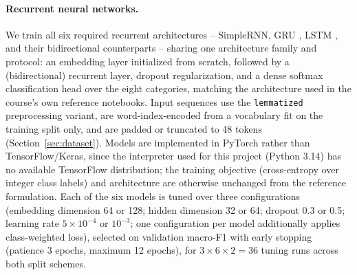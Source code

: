 \documentclass[11pt]{acl}
\begin{document}
\paragraph{Recurrent neural networks.} We train all six required recurrent
architectures -- SimpleRNN, GRU \cite{cho-etal-2014-learning}, LSTM
\cite{hochreiter-schmidhuber-1997-lstm}, and their bidirectional counterparts
\cite{schuster-paliwal-1997-bidirectional} -- sharing one architecture family and
protocol: an embedding layer initialized from scratch, followed by a
(bidirectional) recurrent layer, dropout regularization, and a dense softmax
classification head over the eight categories, matching the architecture used in the
course's own reference notebooks. Input sequences use the \texttt{lemmatized}
preprocessing variant, are word-index-encoded from a vocabulary fit on the training
split only, and are padded or truncated to 48 tokens (Section~\ref{sec:dataset}).
Models are implemented in PyTorch \cite{paszke-etal-2019-pytorch} rather than
TensorFlow/Keras, since the interpreter used for this project (Python 3.14) has no
available TensorFlow distribution; the training objective (cross-entropy over integer
class labels) and architecture are otherwise unchanged from the reference formulation.
Each of the six models is tuned over three configurations (embedding dimension 64 or
128; hidden dimension 32 or 64; dropout 0.3 or 0.5; learning rate $5{\times}10^{-4}$ or
$10^{-3}$; one configuration per model additionally applies class-weighted loss),
selected on validation macro-F1 with early stopping (patience 3 epochs, maximum 12
epochs), for $3 \times 6 \times 2 = 36$ tuning runs across both split schemes.
\end{document}
